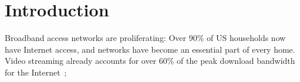 \begin{center}
{\large \bf \TITLE}
\end{center}

\section{Introduction}

Broadband access networks are proliferating: Over 90\% of US households
now have Internet access, and networks have become an essential part of
every home.  Video streaming already accounts for over 60\% of the peak
download bandwidth for the Internet~\cite{www-bismark};
